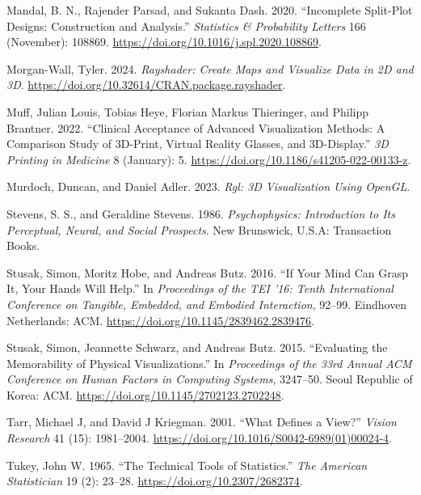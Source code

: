 \documentclass[
  letterpaper,
  DIV=11,
  numbers=noendperiod]{scrartcl}
\newlength{\cslhangindent}
\newenvironment{CSLReferences}[2] %
 {\begin{list}{}{%
  \setlength{\itemindent}{0pt}
  \setlength{\leftmargin}{0pt}
  \setlength{\parsep}{0pt}
  \ifodd #1
   \setlength{\leftmargin}{\cslhangindent}
   \setlength{\itemindent}{-1\cslhangindent}
  \fi
  \setlength{\itemsep}{#2\baselineskip}}}
 {\end{list}}
\begin{document}
\begin{CSLReferences}{1}{0}
Mandal, B. N., Rajender Parsad, and Sukanta Dash. 2020. {``Incomplete
Split-Plot Designs: Construction and Analysis.''} \emph{Statistics \&
Probability Letters} 166 (November): 108869.
\url{https://doi.org/10.1016/j.spl.2020.108869}.

Morgan-Wall, Tyler. 2024. \emph{Rayshader: Create Maps and Visualize
Data in 2D and 3D}.
\url{https://doi.org/10.32614/CRAN.package.rayshader}.

Muff, Julian Louis, Tobias Heye, Florian Markus Thieringer, and Philipp
Brantner. 2022. {``Clinical Acceptance of Advanced Visualization
Methods: A Comparison Study of 3D-Print, Virtual Reality Glasses, and
3D-Display.''} \emph{3D Printing in Medicine} 8 (January): 5.
\url{https://doi.org/10.1186/s41205-022-00133-z}.

Murdoch, Duncan, and Daniel Adler. 2023. \emph{Rgl: 3D Visualization
Using OpenGL}.

Stevens, S. S., and Geraldine Stevens. 1986. \emph{Psychophysics:
Introduction to Its Perceptual, Neural, and Social Prospects}. New
Brunswick, U.S.A: Transaction Books.

Stusak, Simon, Moritz Hobe, and Andreas Butz. 2016. {``If {Your Mind Can
Grasp It}, {Your Hands Will Help}.''} In \emph{Proceedings of the {TEI}
'16: {Tenth International Conference} on {Tangible}, {Embedded}, and
{Embodied Interaction}}, 92--99. Eindhoven Netherlands: ACM.
\url{https://doi.org/10.1145/2839462.2839476}.

Stusak, Simon, Jeannette Schwarz, and Andreas Butz. 2015. {``Evaluating
the {Memorability} of {Physical Visualizations}.''} In \emph{Proceedings
of the 33rd {Annual ACM Conference} on {Human Factors} in {Computing
Systems}}, 3247--50. Seoul Republic of Korea: ACM.
\url{https://doi.org/10.1145/2702123.2702248}.

Tarr, Michael J, and David J Kriegman. 2001. {``What Defines a View?''}
\emph{Vision Research} 41 (15): 1981--2004.
\url{https://doi.org/10.1016/S0042-6989(01)00024-4}.

Tukey, John W. 1965. {``The Technical Tools of Statistics.''} \emph{The
American Statistician} 19 (2): 23--28.
\url{https://doi.org/10.2307/2682374}.


\end{CSLReferences}
\end{document}
